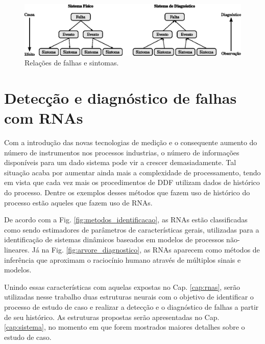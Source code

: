 \begin{figure}[htb]
\centering
    \includegraphics[width=\textwidth]{imgs/detec_diag/eps/falha_sintoma}
    \caption{Relações de falhas e sintomas.}
    \label{fig:falha_sintoma}
\end{figure}

\section{Detecção e diagnóstico de falhas com RNAs}
Com a introdução das novas tecnologias de medição e o consequente aumento do
número de instrumentos nos processos industrias, o número de informações
disponíveis para um dado sistema pode vir a crescer demasiadamente. Tal situação
acaba por aumentar ainda mais a complexidade de processamento, tendo em vista
que cada vez mais os procedimentos de DDF utilizam dados de histórico do
processo. Dentre os exemplos desses métodos que fazem uso de histórico do
processo estão aqueles que fazem uso de RNAs.

De acordo com a Fig. \ref{fig:metodos_identificacao}, as RNAs estão
classificadas como sendo estimadores de parâmetros de características gerais,
utilizadas para a identificação de sistemas dinâmicos baseados em modelos de
processos não-lineares. Já na Fig. \ref{fig:arvore_diagnostico}, as RNAs
aparecem como métodos de inferência que aproximam o raciocínio humano através de
múltiplos sinais e modelos.

Unindo essas características com aquelas expostas no Cap. \ref{cap:rnas}, serão
utilizadas nesse trabalho duas estruturas neurais com o objetivo de identificar
o processo de estudo de caso e realizar a detecção e o diagnóstico de falhas a
partir de seu histórico. As estruturas propostas serão apresentadas no Cap.
\ref{cap:sistema}, no momento em que forem mostrados maiores detalhes sobre o
estudo de caso.

